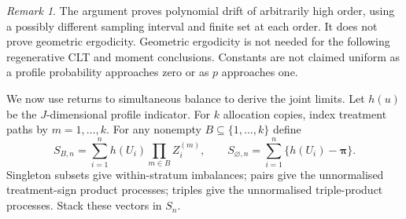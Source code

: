 \documentclass[12pt,a4paper]{article}
\theoremstyle{definition}
\theoremstyle{remark}\newtheorem{remark}{Remark}
\numberwithin{equation}{section}
\begin{document}
\begin{remark}
The argument proves polynomial drift of arbitrarily high order, using a possibly different sampling interval and finite set at each order. It does not prove geometric ergodicity. Geometric ergodicity is not needed for the following regenerative CLT and moment conclusions. Constants are not claimed uniform as a profile probability approaches zero or as $p$ approaches one.
\end{remark}

We now use returns to simultaneous balance to derive the joint limits.
Let $h(u)$ be the $J$-dimensional profile indicator. For $k$ allocation copies, index treatment paths by $m=1,\ldots,k$. For any nonempty $B\subseteq\{1,\ldots,k\}$ define
\[
 S_{B,n}=\sum_{i=1}^n h(U_i)\prod_{m\in B}Z_i^{(m)},\qquad
 S_{\varnothing,n}=\sum_{i=1}^n\{h(U_i)-\bm\pi\}.
\]
Singleton subsets give within-stratum imbalances; pairs give the unnormalised treatment-sign product processes; triples give the unnormalised triple-product processes. Stack these vectors in $S_n$.
\end{document}
